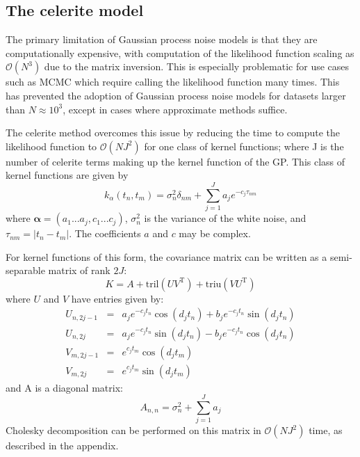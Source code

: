 \documentclass[modern]{aastex62}
\newcommand{\project}[1]{\textsf{#1}}
\newcommand{\celerite}{\project{celerite }}
\newcommand{\bvec}[1]{{\ensuremath{\boldsymbol{#1}}}}
\newcommand{\T}{\ensuremath{\mathrm{T}}}
\begin{document}
	\subsection{The \celerite model}
		The primary limitation of Gaussian process noise models is that they are computationally expensive, with computation of the likelihood function scaling as 
		$\mathcal{O}(N^3)$ due to the matrix inversion. This is especially problematic for use cases such as MCMC which require calling the likelihood function many 
		times. This has prevented the adoption of Gaussian process noise models for datasets larger than $N \approx 10^3$, except in cases where approximate 
		methods suffice. 
		
		The \celerite method overcomes this issue by reducing the time to compute the likelihood function to $\mathcal{O}(NJ^2)$ for one 
		class of kernel functions; where J is the number of \celerite terms making up the kernel function of the GP. This class of kernel functions are given by 
		\begin{equation}
			k_\alpha(t_n, t_m) = \sigma_n^2 \delta_{nm} + \sum_{j=1}^J a_j e^{-c_j\tau_{nm}}
		\end{equation}
		where $\bvec{\alpha} = (a_1...a_j, c_1...c_j)$, $\sigma_n^2$ is the variance of the white noise, and $\tau_{nm} = |t_n-t_m|$. 
		The coefficients $a$ and $c$ may be complex.
	
		For kernel functions of this form, the covariance matrix can be written as a semi-separable matrix of rank $2J$:
		\begin{equation}
			K = A + \mathrm{tril}(UV^\T) + \mathrm{triu}(VU^\T)
		\end{equation}
		where $U$ and $V$ have entries given by: 
		\begin{eqnarray}
			U_{n, 2j-1} &=& a_je^{-c_jt_n}\cos(d_jt_n) + b_je^{-c_jt_n}\sin(d_jt_n) \nonumber \\
			U_{n, 2j} &=& a_je^{-c_jt_n}\sin(d_jt_n) - b_je^{-c_jt_n}\cos(d_jt_n) \nonumber \\
			V_{m, 2j-1} &=& e^{c_jt_m}\cos(d_jt_m) \nonumber \\
			V_{m, 2j} &=& e^{c_jt_m}\sin(d_jt_m)
		\end{eqnarray}
		and A is a diagonal matrix:
		\begin{equation}
			A_{n,n} = \sigma_n^2 + \sum_{j=1}^Ja_j
		\end{equation}
		Cholesky decomposition can be performed on this matrix in $\mathcal{O}(NJ^2)$ time, as described in the appendix. 
		 
\end{document}
